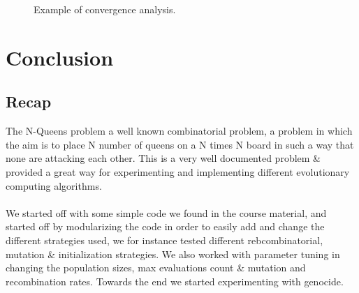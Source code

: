 \documentclass{scrartcl}
\begin{document}
\begin{figure}[h]
\centering
{}
\caption{Example of convergence analysis.}
\label{fig:plot_example}
\end{figure}

\lipsum[4]

\section{Conclusion}
\subsection{Recap}
The N-Queens problem a well known combinatorial problem, a problem in which the aim is to place N number of queens on a N times N board in such a way that none are attacking each other. This is a very well documented problem \& provided a great way for experimenting and implementing different evolutionary computing algorithms.
\\\\
We started off with some simple code we found in the course material, and started off by modularizing the code in order to easily add and change the different strategies used, we for instance tested different rebcombinatorial, mutation \& initialization strategies. We also worked with parameter tuning in changing the population sizes, max evaluations count \& mutation and recombination rates. Towards the end we started experimenting with genocide.
\end{document}
